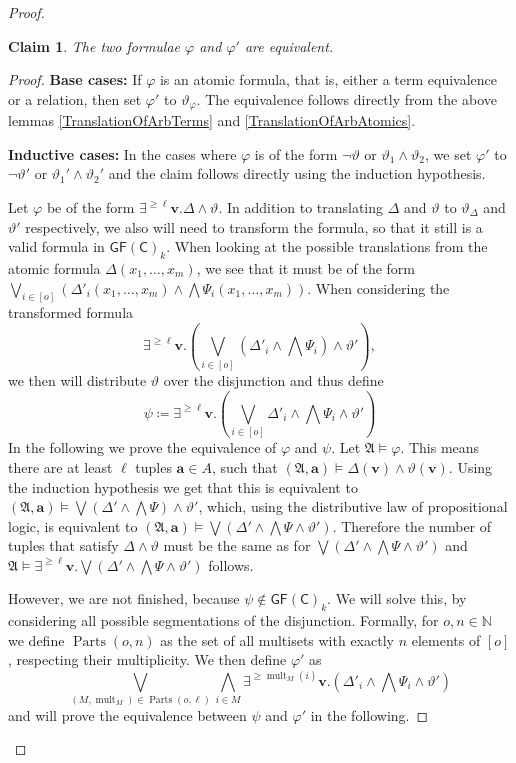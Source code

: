\documentclass[a4paper,11pt,DIV=15]{scrartcl} %
\renewcommand{\phi}{\varphi}
\theoremstyle{plain}
\newtheorem{claim}[theorem]{Claim}
\theoremstyle{definition}
\newcommand{\GFC}{\mathsf{GF}(\mathsf{C})}
\renewcommand{\theta}{\vartheta}
\begin{document}
\begin{proof}
	\begin{claim}
		The two formulae $\phi$ and $\phi'$ are equivalent.
	\end{claim}
	\begin{proof}
		\textbf{Base cases:}
		If $\phi$ is an atomic formula, that is, either a term equivalence or a relation, then set $\phi'$ to $\theta_\phi$.
		The equivalence follows directly from the above lemmas \ref{TranslationOfArbTerms} and \ref{TranslationOfArbAtomics}.
		
		\textbf{Inductive cases:}
		In the cases where $\phi$ is of the form $\neg\theta$ or $\theta_1\land\theta_2$, we set $\phi'$ to $\neg\theta'$ or $\theta_1'\land\theta_2'$ and the claim follows directly using the induction hypothesis.
		
		Let $\phi$ be of the form $\exists^{\geq\ell}\mathbf v. \Delta\land \theta$.
		In addition to translating $\Delta$ and $\theta$ to $\theta_\Delta$ and $\theta'$ respectively, we also will need to transform the formula, so that it still is a valid formula in $\GFC_k$.
		When looking at the possible translations from the atomic formula $\Delta(x_1,\dots,x_m)$, we see that it must be of the form $\bigvee_{i\in[o]} (\Delta'_i(x_1,\dots,x_m) \land \bigwedge \Psi_i(x_1,\dots,x_m))$.
		When considering the transformed formula 
		$$\exists^{\geq \ell}\mathbf v. \left(\bigvee_{i\in [o]}(\Delta'_i\land\bigwedge \Psi_i) \land \theta'\right),$$
		we then will distribute $\theta$ over the disjunction and thus define
		$$\psi \coloneqq \exists^{\geq \ell}\mathbf v. \left(\bigvee_{i\in[o]} \Delta'_i\land\bigwedge \Psi_i \land \theta'\right)$$
		In the following we prove the equivalence of $\phi$ and $\psi$.
		Let $\mathfrak A\models \phi$.
		This means there are at least $\ell$ tuples $\mathbf a\in A$, such that $(\mathfrak A,\mathbf a)\models \Delta(\mathbf v) \land \theta(\mathbf v)$.
		Using the induction hypothesis we get that this is equivalent to $(\mathfrak A,\mathbf a)\models \bigvee(\Delta'\land\bigwedge\Psi)\land \theta'$, which, using the distributive law of propositional logic, is equivalent to $(\mathfrak A,\mathbf a)\models \bigvee(\Delta'\land\bigwedge\Psi\land\theta')$.
		Therefore the number of tuples that satisfy $\Delta\land\theta$ must be the same as for $\bigvee(\Delta'\land\bigwedge\Psi\land\theta')$ and $\mathfrak A\models \exists^{\geq\ell}\mathbf v. \bigvee (\Delta'\land\bigwedge\Psi\land\theta')$ follows.
		
		However, we are not finished, because $\psi \notin \GFC_k$.
		We will solve this, by considering all possible segmentations of the disjunction.
		Formally, for $o,n\in\mathbb N$ we define $\operatorname{Parts}(o, n)$ as the set of all multisets with exactly $n$ elements of $[o]$, respecting their multiplicity.
		We then define $\phi'$ as
		$$\bigvee_{(M,\operatorname{mult}_M)\in \operatorname{Parts}(o,\ell)} \bigwedge_{i\in M} \exists^{\geq \operatorname{mult}_M(i)}\mathbf v. (\Delta'_i\land\bigwedge \Psi_i \land \theta')$$
		and will prove the equivalence between $\psi$ and $\phi'$ in the following. 
		

\end{proof}
\end{proof}
\end{document}

